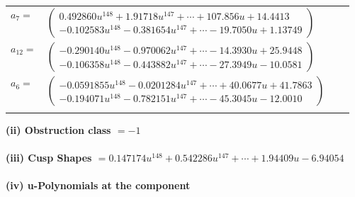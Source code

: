 \documentclass[1p]{elsarticle_modified}
\theoremstyle{definition}
\begin{document}
\begin{tabular}{m{7pt} m{180pt} m{7pt} m{180pt} }
\flushright $a_{7}=$&$\begin{pmatrix}0.492860 u^{148}+1.91718 u^{147}+\cdots+107.856 u+14.4413\\-0.102583 u^{148}-0.381654 u^{147}+\cdots-19.7050 u+1.13749\end{pmatrix}$ \\
\flushright $a_{12}=$&$\begin{pmatrix}-0.290140 u^{148}-0.970062 u^{147}+\cdots-14.3930 u+25.9448\\-0.106358 u^{148}-0.443882 u^{147}+\cdots-27.3949 u-10.0581\end{pmatrix}$ \\
\flushright $a_{6}=$&$\begin{pmatrix}-0.0591855 u^{148}-0.0201284 u^{147}+\cdots+40.0677 u+41.7863\\-0.194071 u^{148}-0.782151 u^{147}+\cdots-45.3045 u-12.0010\end{pmatrix}$\\&\end{tabular}
\flushleft \textbf{(ii) Obstruction class $= -1$}\\~\\
\flushleft \textbf{(iii) Cusp Shapes $= 0.147174 u^{148}+0.542286 u^{147}+\cdots+1.94409 u-6.94054$}\\~\\
\newpage\renewcommand{\arraystretch}{1}
\flushleft \textbf{(iv) u-Polynomials at the component}\newline \\
\end{document}
